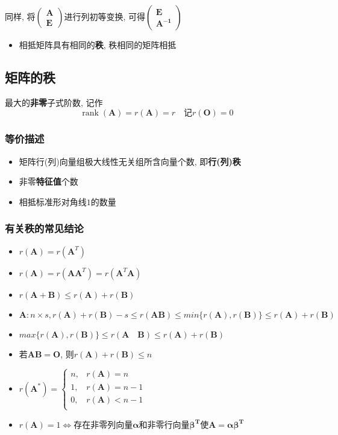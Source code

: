\documentclass{article}
\begin{document}
			同样, 将$\left(\begin{array}{c}\boldsymbol{A} \\ \boldsymbol{E}\end{array}\right)$进行列初等变换, 可得$\left(\begin{array}{c}\boldsymbol{E} \\ \boldsymbol{A^{-1}}\end{array}\right)$
			\begin{itemize}
				\item 相抵矩阵具有相同的\textbf{秩}, 秩相同的矩阵相抵
			\end{itemize}
		\subsection{矩阵的秩}
			最大的\textbf{非零}子式阶数, 记作
			$$
			\operatorname{rank}(\boldsymbol{A})=r(\boldsymbol{A})=r\quad
			\text{记}r(\boldsymbol{O})=0
			$$
			\subsubsection{等价描述}
			\begin{itemize}
				\item 矩阵行(列)向量组极大线性无关组所含向量个数, 即\textbf{行(列)秩}
				\item 非零\textbf{特征值}个数
				\item 相抵标准形对角线$1$的数量
			\end{itemize}
				\subsubsection{有关秩的常见结论}
				\begin{itemize}
					\item $r(\boldsymbol{A})=r(\boldsymbol{A}^T)$
					\item $r(\boldsymbol{A})=r(\boldsymbol{AA}^T)=r(\boldsymbol{A}^T\boldsymbol A)$
					\item $r(\boldsymbol{A}+\boldsymbol{B})\leqslant r(\boldsymbol{A})+r(\boldsymbol{B})$
					\item $\boldsymbol{A}:n\times s,r(\boldsymbol{A})+r(\boldsymbol{B})-s\leqslant r(\boldsymbol{AB})\leqslant min\{r(\boldsymbol{A}),r(\boldsymbol{B})\}\leqslant r(\boldsymbol{A})+r(\boldsymbol{B})$
					\item $max\{r(\boldsymbol{A}),r(\boldsymbol{B})\}\leqslant r(\boldsymbol{A}\quad\boldsymbol{B})\leqslant r(\boldsymbol{A})+r(\boldsymbol{B})$
					\item 若$\boldsymbol{AB}=\boldsymbol{O}$, 则$r(\boldsymbol{A})+r(\boldsymbol{B})\leqslant n$
					\item $r(\boldsymbol{A}^*)=
					\left \{
					\begin{array}{cl}
						n, & r(\boldsymbol{A})=n \\
						1, & r(\boldsymbol{A})=n-1 \\
						0, & r(\boldsymbol{A})<n-1 \\
					\end{array}
					\right.$
					\item $r(\boldsymbol{A})=1\Leftrightarrow$存在非零列向量$\boldsymbol\alpha$和非零行向量$\boldsymbol{\beta ^T}$使$\boldsymbol{A=\alpha\beta^T}$
				\end{itemize}
\end{document}
